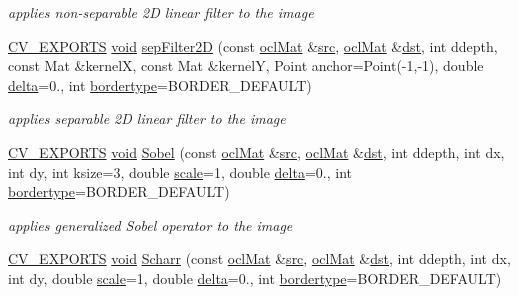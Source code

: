 \begin{DoxyCompactItemize}
\begin{DoxyCompactList}\small\item\em applies non-\/separable 2\-D linear filter to the image \end{DoxyCompactList}\item 
\hyperlink{core_2types__c_8h_a1bf9f0e121b54272da02379cfccd0a2b}{C\-V\-\_\-\-E\-X\-P\-O\-R\-T\-S} \hyperlink{legacy_8hpp_a8bb47f092d473522721002c86c13b94e}{void} \hyperlink{namespacecv_1_1ocl_ad677288a2e5360be6be0b17fd31dd518}{sep\-Filter2\-D} (const \hyperlink{classcv_1_1ocl_1_1oclMat}{ocl\-Mat} \&\hyperlink{legacy_8hpp_a371cd109b74033bc4366f584edd3dacc}{src}, \hyperlink{classcv_1_1ocl_1_1oclMat}{ocl\-Mat} \&\hyperlink{photo__c_8h_aed13e2a25279b24dc954073233fef7a5}{dst}, int ddepth, const Mat \&kernel\-X, const Mat \&kernel\-Y, Point anchor=Point(-\/1,-\/1), double \hyperlink{legacy_8hpp_ac867054f00f4be8b1f3ebce6fba31982}{delta}=0., int \hyperlink{imgproc__c_8h_a217d51a46c1bcfec1157d02663e6e499}{bordertype}=B\-O\-R\-D\-E\-R\-\_\-\-D\-E\-F\-A\-U\-L\-T)
\begin{DoxyCompactList}\small\item\em applies separable 2\-D linear filter to the image \end{DoxyCompactList}\item 
\hyperlink{core_2types__c_8h_a1bf9f0e121b54272da02379cfccd0a2b}{C\-V\-\_\-\-E\-X\-P\-O\-R\-T\-S} \hyperlink{legacy_8hpp_a8bb47f092d473522721002c86c13b94e}{void} \hyperlink{namespacecv_1_1ocl_a1db81282a1f78b000281e06bc0adaad7}{Sobel} (const \hyperlink{classcv_1_1ocl_1_1oclMat}{ocl\-Mat} \&\hyperlink{legacy_8hpp_a371cd109b74033bc4366f584edd3dacc}{src}, \hyperlink{classcv_1_1ocl_1_1oclMat}{ocl\-Mat} \&\hyperlink{photo__c_8h_aed13e2a25279b24dc954073233fef7a5}{dst}, int ddepth, int dx, int dy, int ksize=3, double \hyperlink{objdetect_8hpp_a1f622eb9b9e06b30862ca90cdf2c078b}{scale}=1, double \hyperlink{legacy_8hpp_ac867054f00f4be8b1f3ebce6fba31982}{delta}=0., int \hyperlink{imgproc__c_8h_a217d51a46c1bcfec1157d02663e6e499}{bordertype}=B\-O\-R\-D\-E\-R\-\_\-\-D\-E\-F\-A\-U\-L\-T)
\begin{DoxyCompactList}\small\item\em applies generalized Sobel operator to the image \end{DoxyCompactList}\item 
\hyperlink{core_2types__c_8h_a1bf9f0e121b54272da02379cfccd0a2b}{C\-V\-\_\-\-E\-X\-P\-O\-R\-T\-S} \hyperlink{legacy_8hpp_a8bb47f092d473522721002c86c13b94e}{void} \hyperlink{namespacecv_1_1ocl_ace28b9cef90e9ff0175af7252014b744}{Scharr} (const \hyperlink{classcv_1_1ocl_1_1oclMat}{ocl\-Mat} \&\hyperlink{legacy_8hpp_a371cd109b74033bc4366f584edd3dacc}{src}, \hyperlink{classcv_1_1ocl_1_1oclMat}{ocl\-Mat} \&\hyperlink{photo__c_8h_aed13e2a25279b24dc954073233fef7a5}{dst}, int ddepth, int dx, int dy, double \hyperlink{objdetect_8hpp_a1f622eb9b9e06b30862ca90cdf2c078b}{scale}=1, double \hyperlink{legacy_8hpp_ac867054f00f4be8b1f3ebce6fba31982}{delta}=0., int \hyperlink{imgproc__c_8h_a217d51a46c1bcfec1157d02663e6e499}{bordertype}=B\-O\-R\-D\-E\-R\-\_\-\-D\-E\-F\-A\-U\-L\-T)

\end{DoxyCompactItemize}
